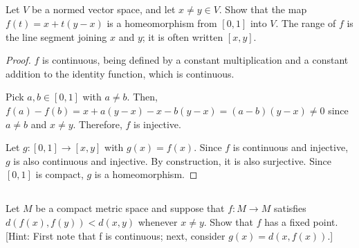 \subsection{} Let $V$ be a normed vector space, and let $x \neq y \in V$. Show that the map $f(t) = x + t(y-x)$ is a homeomorphism from $[0, 1]$ into $V$. The range of $f$ is the line segment joining $x$ and $y$; it is often written $[x, y]$.

\begin{proof}
$f$ is continuous, being defined by a constant multiplication and a constant addition to the identity function, which is continuous.

Pick $a,b \in [0,1]$ with $a \neq b$. Then, $f(a) - f(b) = x + a(y-x) - x - b(y-x) = (a-b)(y-x) \neq 0$ since $a\neq b$ and $x \neq y$. Therefore, $f$ is injective.

Let $g:[0,1] \rightarrow [x,y]$ with $g(x) = f(x)$. Since $f$ is continuous and injective, $g$ is also continuous and injective. By construction, it is also surjective. Since $[0,1]$ is compact, $g$ is a homeomorphism.
\end{proof}



\subsection{} Let $M$ be a compact metric space and suppose that $f: M \rightarrow M$ satisfies $d(f(x), f(y)) < d(x, y)$ whenever $x \neq y$. Show that $f$ has a fixed  point. [Hint: First note that f is continuous; next, consider $g(x) = d(x, f(x))$.]


